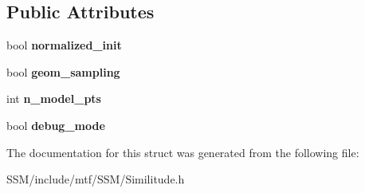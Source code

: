 \subsection*{Public Attributes}
\begin{DoxyCompactItemize}
\item 
\hypertarget{structSimilitudeParams_a9bfcc7824904a7995b82f47991288eb8}{bool {\bfseries normalized\-\_\-init}}\label{structSimilitudeParams_a9bfcc7824904a7995b82f47991288eb8}

\item 
\hypertarget{structSimilitudeParams_a250d5f8efddd81ec702bcca2f69f1529}{bool {\bfseries geom\-\_\-sampling}}\label{structSimilitudeParams_a250d5f8efddd81ec702bcca2f69f1529}

\item 
\hypertarget{structSimilitudeParams_a8a5367acd77d8e3db02eade49f072c9c}{int {\bfseries n\-\_\-model\-\_\-pts}}\label{structSimilitudeParams_a8a5367acd77d8e3db02eade49f072c9c}

\item 
\hypertarget{structSimilitudeParams_a9502cdf6d029b026aacd005fca7313a5}{bool {\bfseries debug\-\_\-mode}}\label{structSimilitudeParams_a9502cdf6d029b026aacd005fca7313a5}

\end{DoxyCompactItemize}


The documentation for this struct was generated from the following file\-:\begin{DoxyCompactItemize}
\item 
S\-S\-M/include/mtf/\-S\-S\-M/Similitude.\-h\end{DoxyCompactItemize}
